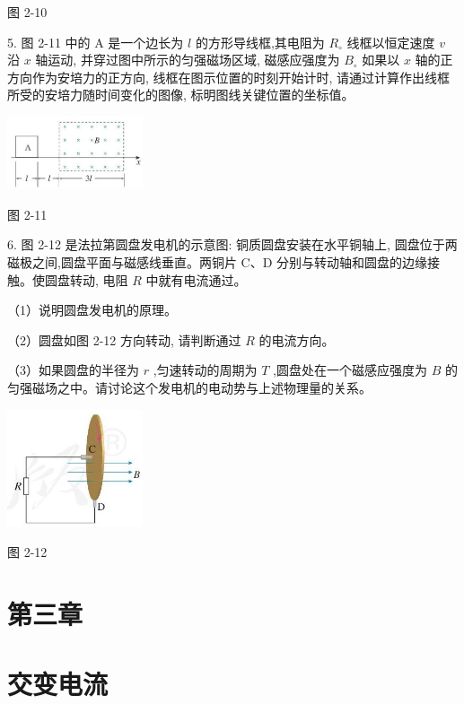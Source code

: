 \documentclass[10pt]{article}
\begin{document}
图 2-10

5. 图 2-11 中的 \(\mathrm{A}\) 是一个边长为 \(l\) 的方形导线框,其电阻为 \({R}_{ \circ }\) 线框以恒定速度 \(v\) 沿 \(x\) 轴运动, 并穿过图中所示的匀强磁场区域, 磁感应强度为 \({B}_{ \circ }\) 如果以 \(x\) 轴的正方向作为安培力的正方向, 线框在图示位置的时刻开始计时, 请通过计算作出线框所受的安培力随时间变化的图像, 标明图线关键位置的坐标值。

\begin{center}
\includegraphics[max width=0.3\textwidth]{images/01910e72-c5b7-7ed5-a6d4-fb3a5faefc32_52_187203.jpg}
\end{center}

图 2-11

6. 图 2-12 是法拉第圆盘发电机的示意图: 铜质圆盘安装在水平铜轴上, 圆盘位于两磁极之间,圆盘平面与磁感线垂直。两铜片 \(\mathrm{C}\text{、}\mathrm{D}\) 分别与转动轴和圆盘的边缘接触。使圆盘转动, 电阻 \(R\) 中就有电流通过。

（1）说明圆盘发电机的原理。

（2）圆盘如图 2-12 方向转动, 请判断通过 \(R\) 的电流方向。

（3）如果圆盘的半径为 \(r\) ,匀速转动的周期为 \(T\) ,圆盘处在一个磁感应强度为 \(B\) 的匀强磁场之中。请讨论这个发电机的电动势与上述物理量的关系。

\begin{center}
\includegraphics[max width=0.3\textwidth]{images/01910e72-c5b7-7ed5-a6d4-fb3a5faefc32_52_980687.jpg}
\end{center}

图 2-12

\section*{第三章}

\section*{交变电流}
\end{document}

